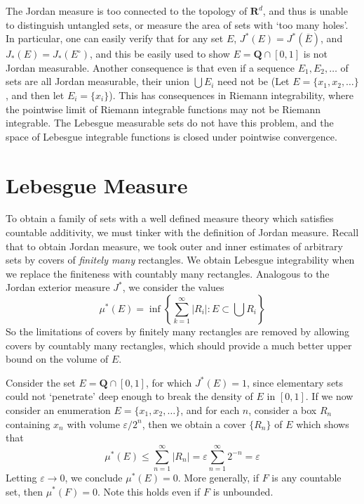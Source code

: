 The Jordan measure is too connected to the topology of $\mathbf{R}^d$, and thus is unable to distinguish untangled sets, or measure the area of sets with `too many holes'. In particular, one can easily verify that for any set $E$, $J^*(E) = J^*(\overline{E})$, and $J_*(E) = J_*(E^\circ)$, and this be easily used to show $E = \mathbf{Q} \cap [0,1]$ is not Jordan measurable. Another consequence is that even if a sequence $E_1, E_2, \dots$ of sets are all Jordan measurable, their union $\bigcup E_i$ need not be (Let $E = \{ x_1, x_2, \dots \}$, and then let $E_i = \{ x_i \}$). This has consequences in Riemann integrability, where the pointwise limit of Riemann integrable functions may not be Riemann integrable. The Lebesgue measurable sets do not have this problem, and the space of Lebesgue integrable functions is closed under pointwise convergence.

\section{Lebesgue Measure}

To obtain a family of sets with a well defined measure theory which satisfies countable additivity, we must tinker with the definition of Jordan measure. Recall that to obtain Jordan measure, we took outer and inner estimates of arbitrary sets by covers of {\it finitely many} rectangles. We obtain Lebesgue integrability when we replace the finiteness with countably many rectangles. Analogous to the Jordan exterior measure $J^*$, we consider the values
%
\[ \mu^*(E) = \inf \left\{ \sum_{k = 1}^\infty |R_i| : E \subset \bigcup R_i \right\} \]
%
So the limitations of covers by finitely many rectangles are removed by allowing covers by countably many rectangles, which should provide a much better upper bound on the volume of $E$.

\begin{example}
  Consider the set $E = \mathbf{Q} \cap [0,1]$, for which $J^*(E) = 1$, since elementary sets could not `penetrate' deep enough to break the density of $E$ in $[0,1]$. If we now consider an enumeration $E = \{ x_1, x_2, \dots \}$, and for each $n$, consider a box $R_n$ containing $x_n$ with volume $\varepsilon/2^n$, then we obtain a cover $\{ R_n \}$ of $E$ which shows that
  \[ \mu^*(E) \leq \sum_{n = 1}^\infty |R_n| = \varepsilon \sum_{n = 1}^\infty 2^{-n} = \varepsilon \]
  Letting $\varepsilon \to 0$, we conclude $\mu^*(E) = 0$. More generally, if $F$ is any countable set, then $\mu^*(F) = 0$. Note this holds even if $F$ is unbounded.
\end{example}


